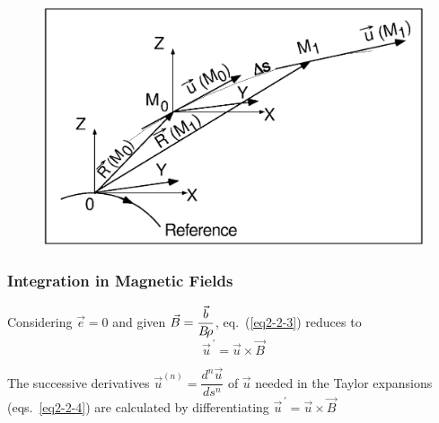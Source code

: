 \begin{figure}[H]
\centerline{\includegraphics[width=14cm]{Fig2.ps}}
\end{figure}

\subsubsection{Integration in Magnetic Fields} \label{sec2.2.1}  %

Considering  $ \vec  e=0 $ and given  $ \vec B=\dfrac{\vec  b}{B\!\rho} $, 
eq.~(\ref{eq2-2-3}) reduces to 
\begin{equation}
 \vec  u^{\,\prime}  = \vec  u  \times  \vec  B   	\label{eqBBrho}
\end{equation}

\noindent The successive derivatives $\vec  u^{(n)} = \dfrac{d^n\vec  u }{ds^n} $ of 
$ \vec  u $ needed in the Taylor expansions (eqs.~\ref{eq2-2-4}) are calculated by differentiating 
$ \vec  u^{\,\prime}            =\vec  u  \times  \vec  B$ 

